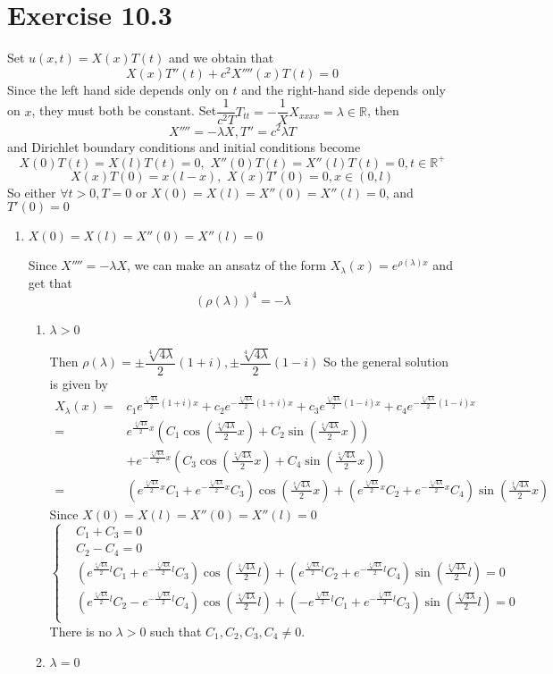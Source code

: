 \documentclass[a4paper,12pt,titlepage]{article}
\begin{document}
\section*{Exercise 10.3}
Set $u(x,t)=X(x)T(t)$ and we obtain that
$$X(x)T''(t)+c^2X''''(x)T(t)=0$$
Since the left hand side depends only on $t$ and the right-hand side depends only on $x$, they must both be constant. Set$\dfrac{1}{c^2T}T_{tt}=-\dfrac{1}{X}X_{xxxx}=\lambda\in\mathbb{R}$, then
$$X''''=-\lambda X, T''=c^2\lambda T$$
and Dirichlet boundary conditions and initial conditions become
$$X(0)T(t)=X(l)T(t)=0,\,\,X''(0)T(t)=X''(l)T(t)=0,t\in\mathbb{R}^+$$
$$X(x)T(0)=x(l-x),\,\,X(x)T'(0)=0,x\in(0,l)$$
So either $\forall t>0, T=0$ or $X(0)=X(l)=X''(0)=X''(l)=0$, and $T'(0)=0$
\begin{enumerate}
\item $X(0)=X(l)=X''(0)=X''(l)=0$

Since $X''''=-\lambda X$, we can make an ansatz of the form $X_{\lambda}(x)=e^{\rho(\lambda)x}$ and get that
$$(\rho(\lambda))^4=-\lambda$$
\begin{enumerate}
\item $\lambda>0$

Then $\rho(\lambda)=\pm\dfrac{\sqrt[4]{4\lambda}}{2}(1+i),\pm\dfrac{\sqrt[4]{4\lambda}}{2}(1-i)$
So the general solution is given by
\begin{align*}
X_{\lambda}(x)=&c_1e^{\frac{\sqrt[4]{4\lambda}}{2}(1+i)x}+c_2e^{-\frac{\sqrt[4]{4\lambda}}{2}(1+i)x}+c_3e^{\frac{\sqrt[4]{4\lambda}}{2}(1-i)x}+c_4e^{-\frac{\sqrt[4]{4\lambda}}{2}(1-i)x}\\
=&e^{\frac{\sqrt[4]{4\lambda}}{2}x}(C_1\cos(\frac{\sqrt[4]{4\lambda}}{2}x)+C_2\sin(\frac{\sqrt[4]{4\lambda}}{2}x))\\
&+e^{-\frac{\sqrt[4]{4\lambda}}{2}x}(C_3\cos(\frac{\sqrt[4]{4\lambda}}{2}x)+C_4\sin(\frac{\sqrt[4]{4\lambda}}{2}x))\\
=&(e^{\frac{\sqrt[4]{4\lambda}}{2}x}C_1+e^{-\frac{\sqrt[4]{4\lambda}}{2}x}C_3)\cos(\frac{\sqrt[4]{4\lambda}}{2}x)+(e^{\frac{\sqrt[4]{4\lambda}}{2}x}C_2+e^{-\frac{\sqrt[4]{4\lambda}}{2}x}C_4)\sin(\frac{\sqrt[4]{4\lambda}}{2}x)
\end{align*} 
Since $X(0)=X(l)=X''(0)=X''(l)=0$
$$\left\{
\begin{aligned}
&C_1+C_3=0\\
&C_2-C_4=0\\
&(e^{\frac{\sqrt[4]{4\lambda}}{2}l}C_1+e^{-\frac{\sqrt[4]{4\lambda}}{2}l}C_3)\cos(\frac{\sqrt[4]{4\lambda}}{2}l)+(e^{\frac{\sqrt[4]{4\lambda}}{2}l}C_2+e^{-\frac{\sqrt[4]{4\lambda}}{2}l}C_4)\sin(\frac{\sqrt[4]{4\lambda}}{2}l)=0\\
&(e^{\frac{\sqrt[4]{4\lambda}}{2}l}C_2-e^{-\frac{\sqrt[4]{4\lambda}}{2}l}C_4)\cos(\frac{\sqrt[4]{4\lambda}}{2}l)+(-e^{\frac{\sqrt[4]{4\lambda}}{2}l}C_1+e^{-\frac{\sqrt[4]{4\lambda}}{2}l}C_3)\sin(\frac{\sqrt[4]{4\lambda}}{2}l)=0\\
\end{aligned}
\right.
$$
There is no $\lambda>0$ such that $C_1,C_2,C_3,C_4\neq0$.
\item $\lambda=0$


\end{enumerate}
\end{enumerate}
\end{document}
